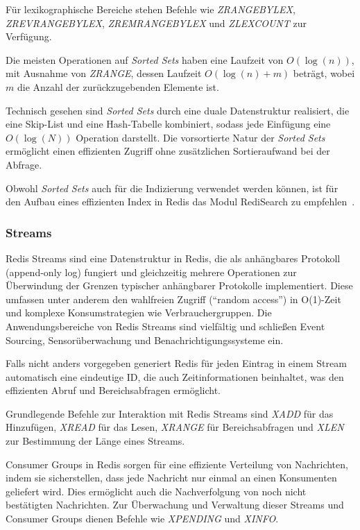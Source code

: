 Für lexikographische Bereiche stehen Befehle wie \emph{ZRANGEBYLEX}, \emph{ZREVRANGEBYLEX}, \emph{ZREMRANGEBYLEX} und \emph{ZLEXCOUNT} zur Verfügung.

Die meisten Operationen auf \emph{Sorted Sets} haben eine Laufzeit von \(O(\log(n))\), mit Ausnahme von \emph{ZRANGE}, dessen Laufzeit \(O(\log(n) + m)\) beträgt, wobei \(m\) die Anzahl der zurückzugebenden Elemente ist.

Technisch gesehen sind \emph{Sorted Sets} durch eine duale Datenstruktur realisiert, die eine Skip-List und eine Hash-Tabelle kombiniert, sodass jede Einfügung eine \(O(\log(N))\) Operation darstellt. Die vorsortierte Natur der \emph{Sorted Sets} ermöglicht einen effizienten Zugriff ohne zusätzlichen Sortieraufwand bei der Abfrage.

Obwohl \emph{Sorted Sets} auch für die Indizierung verwendet werden können, ist für den Aufbau eines effizienten Index in Redis das Modul RediSearch zu empfehlen~\cite{redis_ltd_sorted-sets_nodate}.


\subsubsection{Streams}
Redis Streams sind eine Datenstruktur in Redis, die als anhängbares Protokoll (ap\-pend-on\-ly log) fungiert und gleichzeitig mehrere Operationen zur Überwindung der Grenzen typischer anhängbarer Protokolle implementiert. Diese umfassen unter anderem den wahlfreien Zugriff (\enquote{random access}) in O(1)-Zeit und komplexe Konsumstrategien wie Verbrauchergruppen.
Die Anwendungsbereiche von Redis Streams sind vielfältig und schließen Event Sourcing, Sensorüberwachung und Benachrichtigungssysteme ein.

Falls nicht anders vorgegeben generiert Redis für jeden Eintrag in einem Stream automatisch eine eindeutige ID, die auch Zeitinformationen beinhaltet, was den effizienten Abruf und Bereichsabfragen ermöglicht.

Grundlegende Befehle zur Interaktion mit Redis Streams sind \emph{XADD} für das Hinzufügen, \emph{XREAD} für das Lesen, \emph{XRANGE} für Bereichsabfragen und \emph{XLEN} zur Bestimmung der Länge eines Streams.

Consumer Groups in Redis sorgen für eine effiziente Verteilung von Nachrichten, indem sie sicherstellen, dass jede Nachricht nur einmal an einen Konsumenten geliefert wird. Dies ermöglicht auch die Nachverfolgung von noch nicht bestätigten Nachrichten. Zur Überwachung und Verwaltung dieser Streams und Consumer Groups dienen Befehle wie \emph{XPENDING} und \emph{XINFO}.

